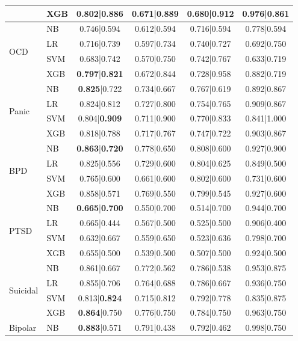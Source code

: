 \documentclass[11pt]{article}
\begin{document}
\begin{table}[t]
{\begin{tabular}{llcccc}
 & XGB & 0.802|\textbf{0.886} & 0.671|0.889 & 0.680|0.912 & 0.976|0.861 \\
\midrule
\multirow{4}{*}{OCD}
 & NB & 0.746|0.594 & 0.612|0.594 & 0.716|0.594 & 0.778|0.594 \\
 & LR & 0.716|0.739 & 0.597|0.734 & 0.740|0.727 & 0.692|0.750 \\
 & SVM & 0.683|0.742 & 0.570|0.750 & 0.742|0.767 & 0.633|0.719 \\
 & XGB & \textbf{0.797}|\textbf{0.821} & 0.672|0.844 & 0.728|0.958 & 0.882|0.719 \\
\midrule
\multirow{4}{*}{Panic}
 & NB & \textbf{0.825}|0.722 & 0.734|0.667 & 0.767|0.619 & 0.892|0.867 \\
 & LR & 0.824|0.812 & 0.727|0.800 & 0.754|0.765 & 0.909|0.867 \\
 & SVM & 0.804|\textbf{0.909} & 0.711|0.900 & 0.770|0.833 & 0.841|1.000 \\
 & XGB & 0.818|0.788 & 0.717|0.767 & 0.747|0.722 & 0.903|0.867 \\
\midrule
\multirow{4}{*}{BPD}
 & NB & \textbf{0.863}|\textbf{0.720} & 0.778|0.650 & 0.808|0.600 & 0.927|0.900 \\
 & LR & 0.825|0.556 & 0.729|0.600 & 0.804|0.625 & 0.849|0.500 \\
 & SVM & 0.765|0.600 & 0.661|0.600 & 0.802|0.600 & 0.731|0.600 \\
 & XGB & 0.858|0.571 & 0.769|0.550 & 0.799|0.545 & 0.927|0.600 \\
\midrule
\multirow{4}{*}{PTSD}
 & NB & \textbf{0.665}|\textbf{0.700} & 0.550|0.700 & 0.514|0.700 & 0.944|0.700 \\
 & LR & 0.665|0.444 & 0.567|0.500 & 0.525|0.500 & 0.906|0.400 \\
 & SVM & 0.632|0.667 & 0.559|0.650 & 0.523|0.636 & 0.798|0.700 \\
 & XGB & 0.655|0.500 & 0.539|0.500 & 0.507|0.500 & 0.924|0.500 \\
\midrule
\multirow{4}{*}{Suicidal}
 & NB & 0.861|0.667 & 0.772|0.562 & 0.786|0.538 & 0.953|0.875 \\
 & LR & 0.855|0.706 & 0.764|0.688 & 0.786|0.667 & 0.936|0.750 \\
 & SVM & 0.813|\textbf{0.824} & 0.715|0.812 & 0.792|0.778 & 0.835|0.875 \\
 & XGB & \textbf{0.864}|0.750 & 0.776|0.750 & 0.784|0.750 & 0.963|0.750 \\
\midrule
\multirow{4}{*}{Bipolar}
 & NB & \textbf{0.883}|0.571 & 0.791|0.438 & 0.792|0.462 & 0.998|0.750 \\

\end{tabular}}
\end{table}
\end{document}
